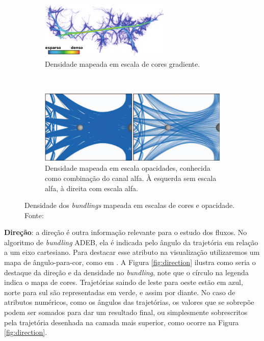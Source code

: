\begin{figure}[ht!]
  \centering
  \begin{subfigure}[t]{\textwidth}
    \centering
    \includegraphics[width=\textwidth]{../figuras/color-density.pdf}
    \caption{Densidade mapeada em escala de cores gradiente.}
  \end{subfigure}
  ~
  \begin{subfigure}[t]{\textwidth}
    \centering
    \includegraphics[width=\textwidth]{../figuras/alpha-blending.pdf}
    \caption{Densidade mapeada em escala opacidades, conhecida como combinação do canal alfa. À esquerda sem escala alfa, à direita com escala alfa.}
  \end{subfigure}
  \caption[Densidade dos \emph{bundlings} mapeada em escalas de cores e
  opacidade.]{Densidade dos \emph{bundlings} mapeada em escalas de cores e
  opacidade. Fonte: \citet{Lhuillier2017} \label{fig:density-mappings}}
\end{figure}

\textbf{Direção}: a direção é outra informação relevante para o estudo dos
fluxos.  No algoritmo de \emph{bundling} ADEB, ela é indicada pelo ângulo da
trajetória em relação a um eixo cartesiano. Para destacar esse atributo na
visualização utilizaremos um mapa de ângulo-para-cor, como em
\citet{ZegarraFlores2016}. A Figura \ref{fig:direction} ilustra como seria o
destaque da direção e da densidade no \emph{bundling}, note que o círculo na
legenda indica o mapa de cores. Trajetórias saindo de leste para oeste estão em
azul, norte para sul são representadas em verde, e assim por diante. No caso de
atributos numéricos, como os ângulos das trajetórias, os valores que se sobrepõe
podem ser somados para dar um resultado final, ou simplesmente sobrescritos
pela trajetória desenhada na camada mais superior, como ocorre na Figura
\ref{fig:direction}. 

